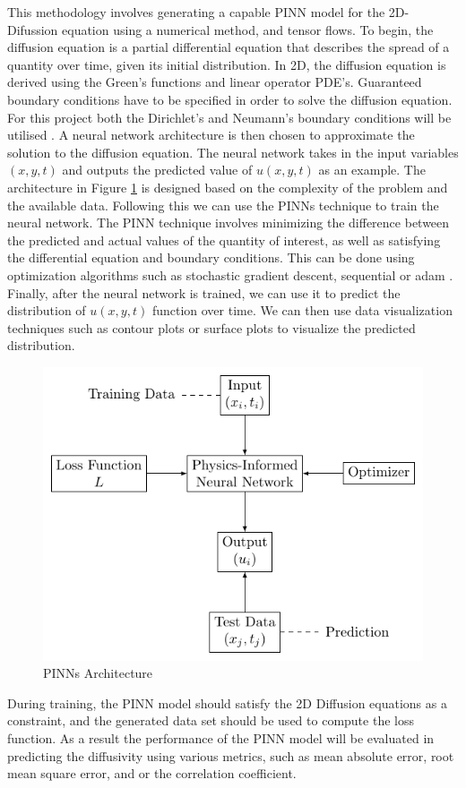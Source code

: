 This methodology involves generating a capable PINN model for the 2D-Difussion equation using a numerical method, and tensor flows. To begin, the diffusion equation is a partial differential equation that describes the spread of a quantity over time, given its initial distribution. In 2D, the diffusion equation is derived using the Green's functions \cite{Sukumar2022} and linear operator PDE's.  Guaranteed boundary conditions have to be specified in order to solve the diffusion equation. For this project both the Dirichlet's and Neumann's boundary conditions will be utilised \cite{Willis1980}. A neural network architecture is then chosen to approximate the solution to the diffusion equation. The neural network takes in the input variables $(x, y, t)$ and outputs the predicted value of $u(x,y,t)$ as an example. The architecture in Figure \ref{fig:arch} is designed based on the complexity of the problem and the available data. Following this we can use the PINNs technique to train the neural network. The PINN technique involves minimizing the difference between the predicted and actual values of the quantity of interest, as well as satisfying the differential equation and boundary conditions. This can be done using optimization algorithms such as stochastic gradient descent, sequential or adam \cite{FernandezdelaMata2023}. Finally, after the neural network is trained, we can use it to predict the distribution of $u(x,y,t)$ function over time. We can then use data visualization techniques such as contour plots or surface plots to visualize the predicted distribution. 
\begin{figure}[htb!]
\begin{center}
\includegraphics[width=.49\textwidth]{images/arc.pdf}
\vspace*{-8mm}
\caption{PINNs Architecture}
\label{fig:arch}
\end{center}
\end{figure}

During training, the PINN model should satisfy the 2D Diffusion equations as a constraint, and the generated data set should be used to compute the loss function. As a result the performance of the PINN model will be evaluated in predicting the diffusivity using various metrics, such as mean absolute error, root mean square error, and or the correlation coefficient.

